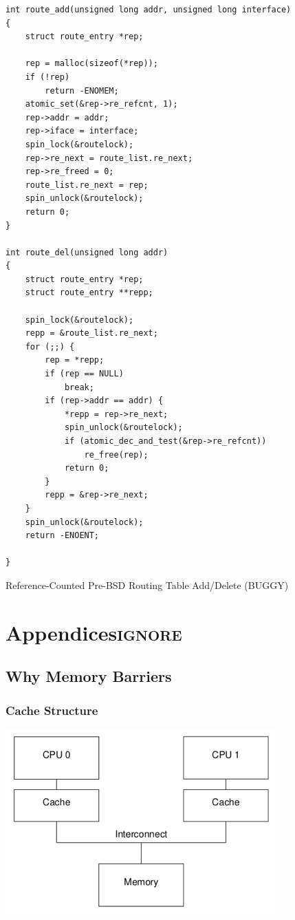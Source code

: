\documentclass[11pt]{article}
\begin{document}
\begin{listing}[htbp]
\begin{verbatim}
int route_add(unsigned long addr, unsigned long interface)
{
    struct route_entry *rep;

    rep = malloc(sizeof(*rep));
    if (!rep)
        return -ENOMEM;
    atomic_set(&rep->re_refcnt, 1);
    rep->addr = addr;
    rep->iface = interface;
    spin_lock(&routelock);
    rep->re_next = route_list.re_next;
    rep->re_freed = 0;
    route_list.re_next = rep;
    spin_unlock(&routelock);
    return 0;
}

int route_del(unsigned long addr)
{
    struct route_entry *rep;
    struct route_entry **repp;

    spin_lock(&routelock);
    repp = &route_list.re_next;
    for (;;) {
        rep = *repp;
        if (rep == NULL)
            break;
        if (rep->addr == addr) {
            *repp = rep->re_next;
            spin_unlock(&routelock);
            if (atomic_dec_and_test(&rep->re_refcnt))
                re_free(rep);
            return 0;
        }
        repp = &rep->re_next;
    }
    spin_unlock(&routelock);
    return -ENOENT;

}
\end{verbatim}
\caption{\label{l9.3}Reference-Counted Pre-BSD Routing Table Add/Delete (BUGGY)}
\end{listing}
\section{Appendices\hfill{}\textsc{ignore}}
\label{sec:org280143d}
\appendix
\subsection{Why Memory Barriers}
\label{sec:org5ac07b7}
\subsubsection{Cache Structure}
\label{sec:org4d6f602}
\begin{center}
\includegraphics[width=.7\textwidth]{../images/perfbook/1.png}
\end{center}
\end{document}
